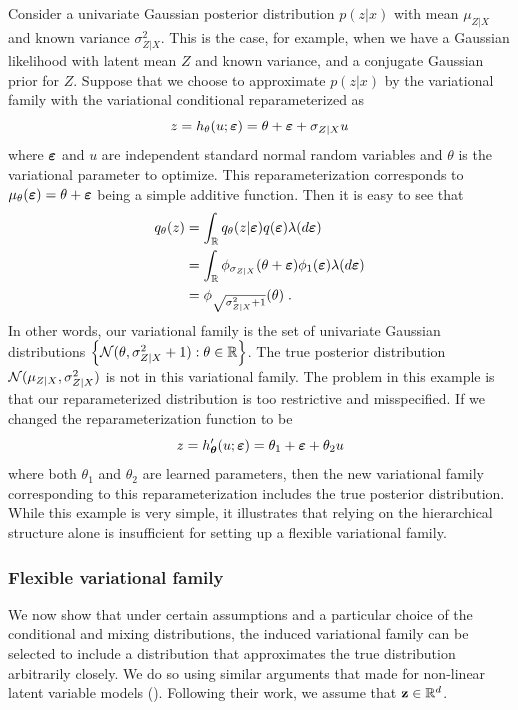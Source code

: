 \documentclass[10pt]{article}
\begin{document}
Consider a univariate Gaussian posterior distribution $p(z|x)$ with mean $\mu_{Z|X}$ and known variance $\sigma_{Z|X}^2$. This is the case, for example, when we have a Gaussian likelihood with latent mean $Z$ and known variance, and a conjugate Gaussian prior for $Z$. Suppose that we choose to approximate $p(z|x)$ by the \uivi variational family with the variational conditional reparameterized as
\[
z = h_\theta(u;\bm{\varepsilon}) = \theta + \bm{\varepsilon} + \sigma_{Z|X}u
\]
where $\bm{\varepsilon}$ and $u$ are independent standard normal random variables and $\theta$ is the variational parameter to optimize. This reparameterization corresponds to $\mu_\theta(\bm{\varepsilon})=\theta+\bm{\varepsilon}$ being a simple additive function. Then it is easy to see that
\begin{align*}
q_\theta(z) &= \int_{\mathbb{R}} q_\theta(z|\bm{\varepsilon})q(\bm{\varepsilon})\lambda(d\bm{\varepsilon}) \\
&= \int_{\mathbb{R}} \phi_{\sigma_{Z|X}}(\theta+\bm{\varepsilon})\phi_1(\bm{\varepsilon}) \lambda(d\bm{\varepsilon}) \\
&= \phi_{\sqrt{\sigma_{Z|X}^2+1}}(\theta) \;.
\end{align*}
In other words, our variational family is the set of univariate Gaussian distributions $\left\{\mathcal{N}(\theta,\sigma_{Z|X}^2+1):\theta\in\mathbb{R}\right\}$. The true posterior distribution $\mathcal{N}(\mu_{Z|X},\sigma_{Z|X}^2)$ is not in this variational family. The problem in this example is that our reparameterized distribution is too restrictive and misspecified. If we changed the reparameterization function to be
\[
z = h_{\bm{\theta}}'(u;\bm{\varepsilon}) = \theta_1 + \bm{\varepsilon} + \theta_2u
\]
where both $\theta_1$ and $\theta_2$ are learned parameters, then the new variational family corresponding to this reparameterization includes the true posterior distribution. While this example is very simple, it illustrates that relying on the hierarchical structure alone is insufficient for setting up a flexible variational family.


\subsubsection{Flexible variational family}

We now show that under certain assumptions and a particular choice of the conditional and mixing distributions, the induced \uivi variational family can be selected to include a distribution that approximates the true distribution arbitrarily closely. We do so using similar arguments that \citet{Plummer:2021} made for non-linear latent variable models (\nllvm). Following their work, we assume that $\mathbf{z}\in\mathbb{R}^d$.
\\
\end{document}
